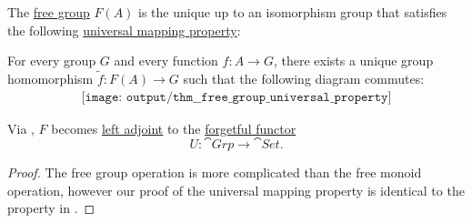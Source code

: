 \begin{theorem}\label{thm:free_group_universal_property}
  The \hyperref[def:free_group]{free group} \( F(A) \) is the unique up to an isomorphism group that satisfies the following \hyperref[rem:universal_mapping_property]{universal mapping property}:
  \begin{displayquote}
    For every group \( G \) and every function \( f: A \to G \), there exists a unique group homomorphism \( \widetilde{f}: F(A) \to G \) such that the following diagram commutes:
    \begin{equation}\label{eq:thm:free_group_universal_property/diagram}
      \begin{aligned}
        \texttt{[image: output/thm\_\_free\_group\_universal\_property]}
      \end{aligned}
    \end{equation}
  \end{displayquote}

  Via , \( F \) becomes \hyperref[def:category_adjunction]{left adjoint} to the \hyperref[def:concrete_category]{forgetful functor}
  \begin{equation*}
    U: \cat{Grp} \to \cat{Set}.
  \end{equation*}
\end{theorem}
\begin{proof}
  The free group operation is more complicated than the free monoid operation, however our proof of the universal mapping property is identical to the property in .
\end{proof}

